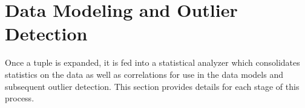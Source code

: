 \section{Data Modeling and Outlier Detection}
\label{sec:implementation}

Once a tuple is expanded, it is fed into a statistical analyzer which consolidates statistics on the data as well as correlations for use in the data models and subsequent outlier detection.
This section provides details for each stage of this process.




